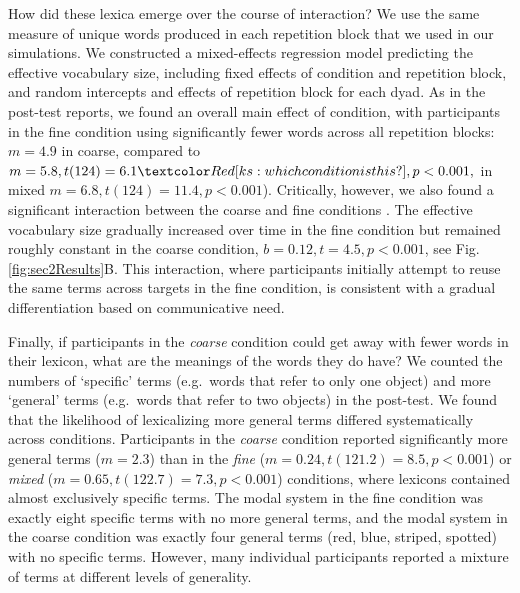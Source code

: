 How did these lexica emerge over the course of interaction? 
We use the same measure of unique words produced in each repetition block that we used in our simulations. 
We constructed a mixed-effects regression model predicting the effective vocabulary size, including fixed effects of condition and repetition block, and random intercepts and effects of repetition block for each dyad. 
As in the post-test reports, we found an overall main effect of condition, with participants in the fine condition using significantly fewer words across all repetition blocks: $m = 4.9$ in coarse, compared to $m=5.8, t(124)=6.1 \ks{which condition is this?}, p <0.001,$ in mixed $m=6.8, t(124) =11.4, p < 0.001$).
Critically, however, we also found a significant interaction between the coarse and fine conditions . 
The effective vocabulary size gradually increased over time in the fine condition but remained roughly constant in the coarse condition, $b = 0.12, t = 4.5, p < 0.001$, see Fig. \ref{fig:sec2Results}B.
This interaction, where participants initially attempt to reuse the same terms across targets in the fine condition, is consistent with a gradual differentiation based on communicative need.

Finally, if participants in the \emph{coarse} condition could get away with fewer words in their lexicon, what are the meanings of the words they do have? 
We counted the numbers of `specific' terms (e.g.~words that refer to only one object) and more `general' terms (e.g.~words that refer to two objects) in the post-test. 
We found that the likelihood of lexicalizing more general terms differed systematically across conditions.
Participants in the \emph{coarse} condition reported significantly more general terms ($m=2.3$) than in the \emph{fine} ($m = 0.24, t(121.2) = 8.5, p < 0.001$) or \emph{mixed} ($m=0.65, t(122.7)= 7.3, p < 0.001$) conditions, where lexicons contained almost exclusively specific terms.
The modal system in the fine condition was exactly eight specific terms with no more general terms, and the modal system in the coarse condition was exactly four general terms (red, blue, striped, spotted) with no specific terms.
However, many individual participants reported a mixture of terms at different levels of generality. 



